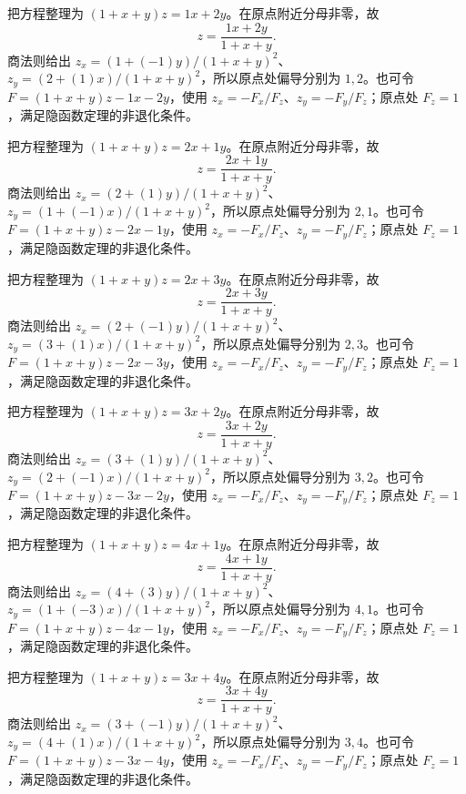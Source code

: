 \documentclass[12pt,fontset=fandol]{ctexart}
\begin{document}
\begin{solve}\label{ans:c33q13}
把方程整理为 $(1+x+y)z=1x+2y$。在原点附近分母非零，故
\[
z=\frac{1x+2y}{1+x+y}.
\]
商法则给出 $z_x=(1+(-1)y)/(1+x+y)^2$、$z_y=(2+(1)x)/(1+x+y)^2$，所以原点处偏导分别为 $1,2$。也可令 $F=(1+x+y)z-1x-2y$，使用 $z_x=-F_x/F_z$、$z_y=-F_y/F_z$；原点处 $F_z=1$，满足隐函数定理的非退化条件。
\end{solve}

\begin{solve}\label{ans:c33q14}
把方程整理为 $(1+x+y)z=2x+1y$。在原点附近分母非零，故
\[
z=\frac{2x+1y}{1+x+y}.
\]
商法则给出 $z_x=(2+(1)y)/(1+x+y)^2$、$z_y=(1+(-1)x)/(1+x+y)^2$，所以原点处偏导分别为 $2,1$。也可令 $F=(1+x+y)z-2x-1y$，使用 $z_x=-F_x/F_z$、$z_y=-F_y/F_z$；原点处 $F_z=1$，满足隐函数定理的非退化条件。
\end{solve}

\begin{solve}\label{ans:c33q15}
把方程整理为 $(1+x+y)z=2x+3y$。在原点附近分母非零，故
\[
z=\frac{2x+3y}{1+x+y}.
\]
商法则给出 $z_x=(2+(-1)y)/(1+x+y)^2$、$z_y=(3+(1)x)/(1+x+y)^2$，所以原点处偏导分别为 $2,3$。也可令 $F=(1+x+y)z-2x-3y$，使用 $z_x=-F_x/F_z$、$z_y=-F_y/F_z$；原点处 $F_z=1$，满足隐函数定理的非退化条件。
\end{solve}

\begin{solve}\label{ans:c33q16}
把方程整理为 $(1+x+y)z=3x+2y$。在原点附近分母非零，故
\[
z=\frac{3x+2y}{1+x+y}.
\]
商法则给出 $z_x=(3+(1)y)/(1+x+y)^2$、$z_y=(2+(-1)x)/(1+x+y)^2$，所以原点处偏导分别为 $3,2$。也可令 $F=(1+x+y)z-3x-2y$，使用 $z_x=-F_x/F_z$、$z_y=-F_y/F_z$；原点处 $F_z=1$，满足隐函数定理的非退化条件。
\end{solve}

\begin{solve}\label{ans:c33q17}
把方程整理为 $(1+x+y)z=4x+1y$。在原点附近分母非零，故
\[
z=\frac{4x+1y}{1+x+y}.
\]
商法则给出 $z_x=(4+(3)y)/(1+x+y)^2$、$z_y=(1+(-3)x)/(1+x+y)^2$，所以原点处偏导分别为 $4,1$。也可令 $F=(1+x+y)z-4x-1y$，使用 $z_x=-F_x/F_z$、$z_y=-F_y/F_z$；原点处 $F_z=1$，满足隐函数定理的非退化条件。
\end{solve}

\begin{solve}\label{ans:c33q18}
把方程整理为 $(1+x+y)z=3x+4y$。在原点附近分母非零，故
\[
z=\frac{3x+4y}{1+x+y}.
\]
商法则给出 $z_x=(3+(-1)y)/(1+x+y)^2$、$z_y=(4+(1)x)/(1+x+y)^2$，所以原点处偏导分别为 $3,4$。也可令 $F=(1+x+y)z-3x-4y$，使用 $z_x=-F_x/F_z$、$z_y=-F_y/F_z$；原点处 $F_z=1$，满足隐函数定理的非退化条件。
\end{solve}
\end{document}
